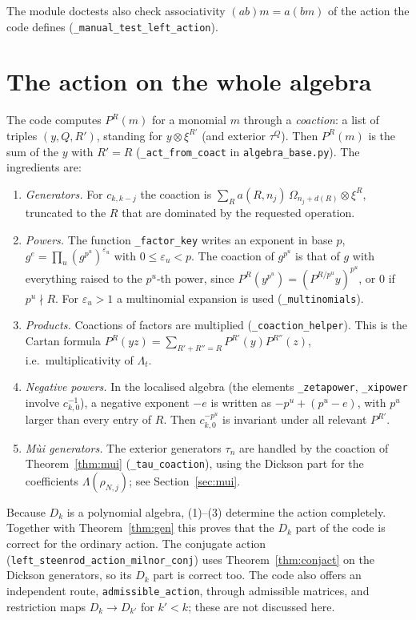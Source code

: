\documentclass[11pt]{amsart}
\theoremstyle{definition}
\theoremstyle{remark}
\newcommand{\Dk}{D_k}
\newcommand{\code}[1]{\texttt{#1}}
\begin{document}
The module doctests also check associativity $(ab)m=a(bm)$ of the action the
code defines (\code{\_manual\_test\_left\_action}).

\section{The action on the whole algebra}\label{sec:whole}

The code computes $P^R(m)$ for a monomial $m$ through a \emph{coaction}: a list
of triples $(y,Q,R')$, standing for $y\otimes\xi^{R'}$ (and exterior
$\tau^Q$).  Then $P^R(m)$ is the sum of the $y$ with $R'=R$
(\code{\_act\_from\_coact} in \code{algebra\_base.py}).  The ingredients are:

\begin{enumerate}
\item \emph{Generators.}  For $c_{k,k-j}$ the coaction is
  $\sum_R a(R,n_j)\,\Omega_{n_j+d(R)}\otimes\xi^R$, truncated to the $R$ that
  are dominated by the requested operation.
\item \emph{Powers.}  The function \code{\_factor\_key} writes an exponent in
  base $p$, $g^{e}=\prod_u (g^{p^u})^{\varepsilon_u}$ with $0\le\varepsilon_u<p$.
  The coaction of $g^{p^u}$ is that of $g$ with everything raised to the $p^u$-th
  power, since $P^R(y^{p^u})=(P^{R/p^u}y)^{p^u}$, or $0$ if $p^u\nmid R$.  For
  $\varepsilon_u>1$ a multinomial expansion is used (\code{\_multinomials}).
\item \emph{Products.}  Coactions of factors are multiplied
  (\code{\_coaction\_helper}).  This is the Cartan formula
  $P^R(yz)=\sum_{R'+R''=R}P^{R'}(y)P^{R''}(z)$, i.e.\ multiplicativity of
  $\Lambda_t$.
\item \emph{Negative powers.}  In the localised algebra (the elements
  \code{\_zetapower}, \code{\_xipower} involve $c_{k,0}^{-1}$), a negative
  exponent $-e$ is written as $-p^u+(p^u-e)$, with $p^u$ larger than every
  entry of $R$.  Then $c_{k,0}^{-p^u}$ is invariant under all relevant $P^{R'}$.
\item \emph{M\`ui generators.}  The exterior generators $\tau_n$ are handled by
  the coaction of Theorem~\ref{thm:mui} (\code{\_tau\_coaction}), using the
  Dickson part for the coefficients $\Lambda(\rho_{N,j})$; see
  Section~\ref{sec:mui}.
\end{enumerate}
Because $\Dk$ is a polynomial algebra, (1)--(3) determine the action
completely.  Together with Theorem~\ref{thm:gen} this proves that the $\Dk$
part of the code is correct for the ordinary action.  The conjugate action
(\code{left\_steenrod\_action\_milnor\_conj}) uses Theorem~\ref{thm:conjact} on
the Dickson generators, so its $\Dk$ part is correct too.  The code also offers an
independent route, \code{admissible\_action}, through admissible matrices, and
restriction maps $D_k\to D_{k'}$ for $k'<k$; these are not discussed here.
\end{document}
